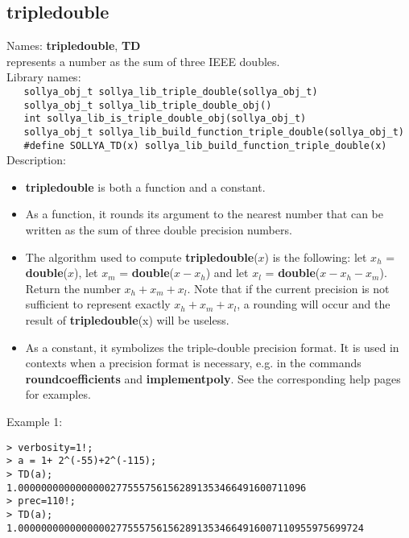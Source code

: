 \subsection{tripledouble}
\label{labtripledouble}
\noindent Names: \textbf{tripledouble}, \textbf{TD}\\
\phantom{aaa}represents a number as the sum of three IEEE doubles.\\[0.2cm]
\noindent Library names:\\
\verb|   sollya_obj_t sollya_lib_triple_double(sollya_obj_t)|\\
\verb|   sollya_obj_t sollya_lib_triple_double_obj()|\\
\verb|   int sollya_lib_is_triple_double_obj(sollya_obj_t)|\\
\verb|   sollya_obj_t sollya_lib_build_function_triple_double(sollya_obj_t)|\\
\verb|   #define SOLLYA_TD(x) sollya_lib_build_function_triple_double(x)|\\[0.2cm]
\noindent Description: \begin{itemize}

\item \textbf{tripledouble} is both a function and a constant.

\item As a function, it rounds its argument to the nearest number that can be written
   as the sum of three double precision numbers.

\item The algorithm used to compute \textbf{tripledouble}($x$) is the following: let $x_h$ = \textbf{double}($x$),
   let $x_m$ = \textbf{double}($x-x_h$) and let $x_l$ = \textbf{double}($x-x_h-x_m$). 
   Return the number $x_h+x_m+x_l$. Note that if the
   current precision is not sufficient to represent exactly $x_h+x_m+x_l$, a rounding will
   occur and the result of \textbf{tripledouble}(x) will be useless.

\item As a constant, it symbolizes the triple-double precision format. It is used in 
   contexts when a precision format is necessary, e.g. in the commands 
   \textbf{roundcoefficients} and \textbf{implementpoly}.
   See the corresponding help pages for examples.
\end{itemize}
\noindent Example 1: 
\begin{center}\begin{minipage}{15cm}\begin{Verbatim}[frame=single,commandchars=\\\|\~]
> verbosity=1!;
> a = 1+ 2^(-55)+2^(-115);
> TD(a);
1.00000000000000002775557561562891353466491600711096
> prec=110!;
> TD(a);
1.000000000000000027755575615628913534664916007110955975699724
\end{Verbatim}
\end{minipage}\end{center}
